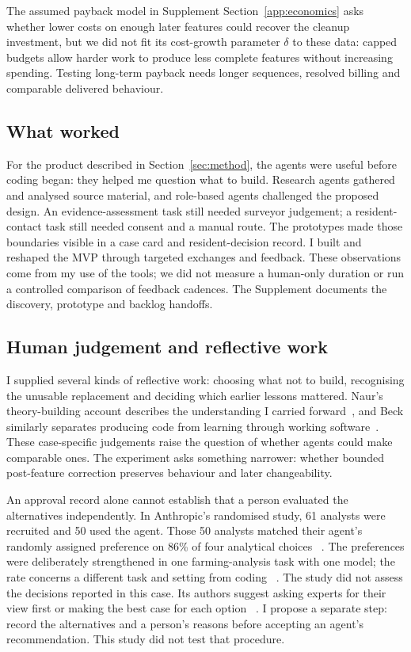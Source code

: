 \documentclass[11pt,a4paper]{article}
\begin{document}
The assumed payback model in Supplement Section~\ref{app:economics} asks whether lower costs on enough later features could recover the cleanup investment, but we did not fit its cost-growth parameter $\delta$ to these
data: capped budgets allow harder work to produce less complete features
without increasing spending. Testing long-term payback needs longer
sequences, resolved billing and comparable delivered behaviour.

\subsection{What worked}

For the product described in Section~\ref{sec:method}, the agents were useful
before coding began: they helped me question what to build. Research agents
gathered and analysed source material, and role-based agents challenged
the proposed design. An evidence-assessment task still
needed surveyor judgement; a resident-contact task still needed consent
and a manual route. The prototypes made those boundaries visible in a
case card and resident-decision record. I built and reshaped the MVP
through targeted exchanges and feedback.
These observations come from my use of the tools; we did not measure a
human-only duration or run a controlled comparison of feedback cadences.
The Supplement documents the discovery, prototype and backlog handoffs.

\subsection{Human judgement and reflective work}

I supplied several kinds of reflective work: choosing what not to build,
recognising the unusable replacement and deciding which earlier lessons
mattered. Naur's theory-building account
describes the understanding I carried forward~\cite{naur1985theory}, and
Beck similarly separates producing code from learning through working
software~\cite{beck2026prodacity}. These case-specific judgements
raise the question of whether agents could make comparable ones.
The experiment asks something narrower: whether bounded post-feature
correction preserves behaviour and later changeability.

An approval record alone cannot establish that a person evaluated the
alternatives independently. In Anthropic's
randomised study, 61 analysts were recruited and 50 used the agent. Those
50 analysts matched their agent's
randomly assigned preference on 86\% of four analytical choices
~\cite[Study design; Results]{herdagdelen2026judgment}. The preferences were
deliberately strengthened in one farming-analysis task with one model; the
rate concerns a different task and setting from coding
~\cite[Our study's limitations]{herdagdelen2026judgment}.
The study did not assess the decisions reported in this case. Its authors suggest
asking experts for their view first or making the best case for each option
~\cite[What this means]{herdagdelen2026judgment}. I propose a separate step:
record the alternatives and a person's reasons before accepting an agent's
recommendation. This study did not test that procedure.
\end{document}
